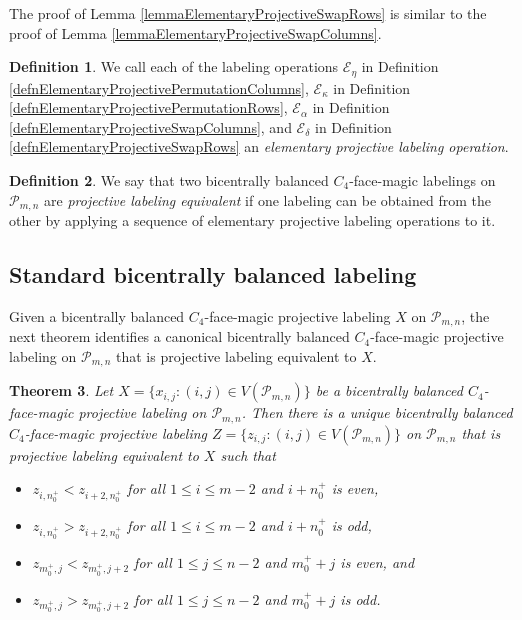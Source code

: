 \documentclass[12pt]{amsart}
\theoremstyle{definition}
\newtheorem{definition}{Definition}
\theoremstyle{plain}
\newtheorem{theorem}[definition]{Theorem}
\begin{document}
The proof of Lemma \ref{lemmaElementaryProjectiveSwapRows} is similar to the proof of Lemma \ref{lemmaElementaryProjectiveSwapColumns}.

\begin{definition}
  We call each of the labeling operations $\mathcal{E}_{\eta}$ in Definition \ref{defnElementaryProjectivePermutationColumns},
  $\mathcal{E}_{\kappa}$ in Definition \ref{defnElementaryProjectivePermutationRows},
  $\mathcal{E}_{\alpha}$ in Definition \ref{defnElementaryProjectiveSwapColumns}, and
  $\mathcal{E}_{\delta}$ in Definition \ref{defnElementaryProjectiveSwapRows} an
  \textit{elementary projective labeling operation}.
\end{definition}

\begin{definition}
  We say that two bicentrally balanced $C_4$-face-magic labelings on $\mathcal{P}_{m,n}$ are
  \textit{projective labeling equivalent} if one labeling can be obtained from the other by applying a sequence
  of elementary projective labeling operations to it.
\end{definition}

\subsection{Standard bicentrally balanced labeling}

Given a bicentrally balanced $C_4$-face-magic projective labeling $X$ on $\mathcal{P}_{m,n}$, the next theorem identifies
a canonical bicentrally balanced $C_4$-face-magic projective labeling on $\mathcal{P}_{m,n}$ that is
projective labeling equivalent to $X$.

\begin{theorem} \label{thmStandardProjectiveLabeling}
  Let $X=\{x_{i,j}:(i,j)\in V(\mathcal{P}_{m,n})\}$ be a bicentrally balanced $C_4$-face-magic projective labeling on $\mathcal{P}_{m,n}$.
  Then there is a unique bicentrally balanced $C_4$-face-magic projective labeling $Z=\{z_{i,j}:(i,j)\in V(\mathcal{P}_{m,n})\}$
  on $\mathcal{P}_{m,n}$ that is projective labeling equivalent to $X$ such that
  \begin{itemize}
    \item $z_{i,n_0^{+}} <  z_{i+2,n_0^{+}}$ for all $1 \leqslant i \leqslant m-2$ and $i+ n^{+}_0$ is even,
    \item $z_{i,n_0^{+}} >  z_{i+2,n_0^{+}}$ for all $1 \leqslant i \leqslant m-2$ and $i+ n^{+}_0$ is odd,
    \item $z_{m_0^{+},j} <  z_{m_0^{+},j+2}$ for all $1 \leqslant j \leqslant n-2$ and $m^{+}_0 +j$ is even, and
    \item $z_{m_0^{+},j} >  z_{m_0^{+},j+2}$ for all $1 \leqslant j \leqslant n-2$ and $m^{+}_0 +j$ is odd.
  \end{itemize}
\end{theorem}
\end{document}
